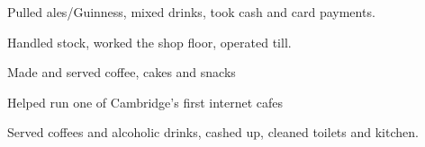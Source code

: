 \documentclass[a4paper,nomath]{deedy-resume} %
\begin{document}
\begin{minipage}[t]{0.66\textwidth}
    \sectionspace %


    
    \begin{tightitemize}
    	\item Pulled ales/Guinness, mixed drinks, took cash and card payments.
    	
    \end{tightitemize}
    
    \sectionspace %
    

    \begin{tightitemize}
        \item Handled stock, worked the shop floor, operated till.
    \end{tightitemize}

    \sectionspace %


	
	\begin{tightitemize}
		\item Made and served coffee, cakes and snacks
	\end{tightitemize}
	
	\sectionspace %



    \begin{tightitemize}
        \item Helped run one of Cambridge's first internet cafes
        \item Served coffees and alcoholic drinks, cashed up, cleaned toilets and kitchen.
    \end{tightitemize}


\end{minipage} %
\end{document}
